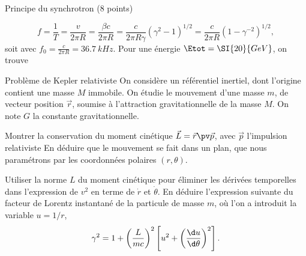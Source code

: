 \begin{exo}[PC][2][devoir]{Principe du synchrotron (8 points)}
\begin{quest}
{        $$
        f=\frac{1}{T}=\frac{v}{2 \pi R}=\frac{\beta c}{2 \pi R}=\frac{c}{2 \pi R \gamma}\left(\gamma^2-1\right)^{1 / 2}=\frac{c}{2 \pi R}\left(1-{\gamma^{-2}}\right)^{1 / 2},
        $$
        soit 
        avec $f_0 = \frac{c}{2 \pi R} = \SI{36.7}{kHz}$. Pour une énergie $\Etot = \SI{20}{GeV}$, on trouve 
        

    }
\end{quest}
\end{exo}

\begin{exo}[PC][3][TD]{Problème de Kepler relativiste}
    On considère un référentiel inertiel, dont l'origine contient une masse $M$ immobile. On étudie le mouvement d'une masse $m$, de vecteur position $\Vec{r}$,  soumise à l’attraction gravitationnelle de la masse $M$. On note $G$ la constante gravitationnelle.
    
    \begin{quest}
    \item Montrer la conservation du moment cinétique $\vec L = \vec r \pv \vec p$, avec $\vec p$ l’impulsion relativiste En déduire que le mouvement se fait dans un plan, que nous paramétrons par les coordonnées polaires $(r, \theta)$.
    
    
    
    
    \item  Utiliser la norme $L$ du moment cinétique pour éliminer les dérivées temporelles dans l'expression de $v^2$ en terme de $\dot{r}$ et $\dot{\theta}$. En déduire l’expression suivante du facteur de Lorentz instantané de la particule de masse $m$, où l'on a introduit la variable $u=1/r$, 
    \begin{equation}\label{eq:gamma} 
    \gamma^2 = 1+\left( \dfrac{L}{mc}\right)^2 \left[ u^2 + \left(\dfrac{\d u}{\d \theta} \right)^2\right].
    \end{equation}
    

\end{quest}
\end{exo}
